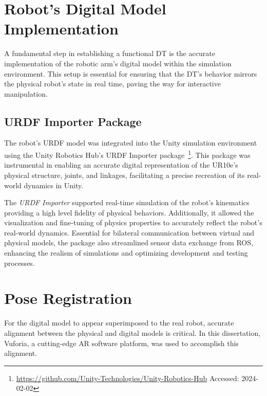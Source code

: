 


\section{Robot's Digital Model Implementation}
\label{section:digital-model}

A fundamental step in establishing a functional \ac{DT} is the accurate implementation of the robotic arm's digital model within the simulation environment. This setup is essential for ensuring that the \ac{DT}'s behavior mirrors the physical robot’s state in real time, paving the way for interactive manipulation.

\subsection{URDF Importer Package}
The robot's \ac{URDF} model was integrated into the Unity simulation environment using the Unity Robotics Hub's \ac{URDF} Importer package~\footnote{\url{https://github.com/Unity-Technologies/Unity-Robotics-Hub} Accessed: 2024-02-02}. This package was instrumental in enabling an accurate digital representation of the UR10e’s physical structure, joints, and linkages, facilitating a precise recreation of its real-world dynamics in Unity.

The \textit{\ac{URDF} Importer} supported real-time simulation of the robot's kinematics providing a high level fidelity of physical behaviors. Additionally, it allowed the visualization and fine-tuning of physics properties to accurately reflect the robot's real-world dynamics. Essential for bilateral communication between virtual and physical models, the package also streamlined sensor data exchange from \ac{ROS}, enhancing the realism of simulations and optimizing development and testing processes.

\section{Pose Registration}
For the digital model to appear superimposed to the real robot, accurate alignment between the physical and digital models is critical. In this dissertation, Vuforia, a cutting-edge \ac{AR} software platform, was used to accomplish this alignment.

